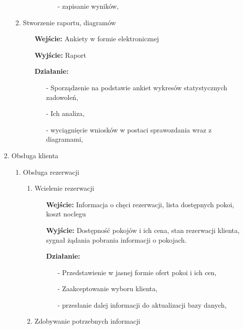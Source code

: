 \documentclass[a4paper, 11pt]{article}
\begin{document}
\begin{enumerate}[label*=\arabic*.]
\begin{enumerate}[label*=\arabic*.]
\begin{enumerate}[label*=\arabic*.]
\begin{itemize}
\begin{itemize}
						\item[-] zapisanie wyników,
					\end{itemize}					
				\end{itemize}	
			\end{enumerate}
			\item Stworzenie raportu, diagramów
			\begin{itemize}
				\item[\textbf{Wejście:}] Ankiety w formie elektronicznej
				\item[\textbf{Wyjście:}] Raport
				\item[\textbf{Działanie:}] 
				\begin{itemize}
					\item[-] Sporządzenie na podstawie ankiet wykresów statystycznych zadowoleń,
					\item[-] Ich analiza,
					\item[-] wyciągnięcie wniosków w postaci sprawozdania wraz z diagramami,
				\end{itemize}									
			\end{itemize}	
		\end{enumerate}
		\item Obsługa klienta
		\begin{enumerate}[label*=\arabic*.]
			\item Obsługa rezerwacji
			\begin{enumerate}[label*=\arabic*.]
				\item Wcielenie rezerwacji
				\begin{itemize}
					\item[\textbf{Wejście:}] Informacja o chęci rezerwacji, lista dostępnych pokoi, koszt noclegu
					\item[\textbf{Wyjście:}] Dostępność pokojów i ich cena, stan rezerwacji klienta, sygnał żądania pobrania informacji o pokojach.
					\item[\textbf{Działanie:}]
					\begin{itemize}
						\item[-] Przedstawienie w jasnej formie ofert pokoi i ich cen,
						\item[-] Zaakceptowanie wyboru klienta,
						\item[-] przesłanie dalej informacji do aktualizacji bazy danych,
					\end{itemize}									
				\end{itemize}	
				\item Zdobywanie potrzebnych informacji
				\begin{itemize}

\end{itemize}
\end{enumerate}
\end{enumerate}
\end{enumerate}
\end{document}
